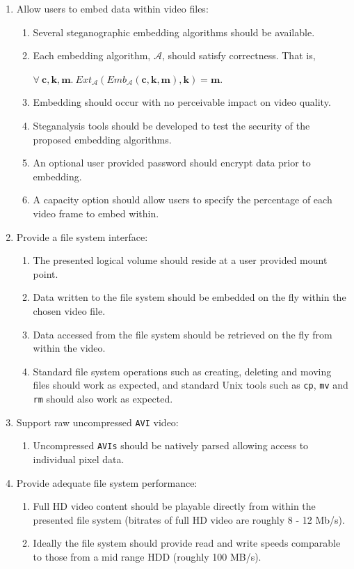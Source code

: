 \documentclass[paper=a4, fontsize=11pt,twoside]{scrartcl}    %
\numberwithin{table}{section}
\numberwithin{figure}{section}
\numberwithin{algorithm}{section}
\begin{document}
\begin{enumerate}
\item Allow users to embed data within video files:
	\begin{enumerate}
		\item Several steganographic embedding algorithms should be available.
		\item Each embedding algorithm, $\mathcal{A}$, should satisfy correctness. That is,
		\begin{center}
			$\forall ~\textbf{c}, \textbf{k}, \textbf{m}. ~Ext_{\mathcal{A}}(Emb_{\mathcal{A}}(\textbf{c}, \textbf{k}, \textbf{m}), \textbf{k}) = \textbf{m}$.
		\end{center}
		\item Embedding should occur with no perceivable impact on video quality.
		\item Steganalysis tools should be developed to test the security of the proposed embedding algorithms.
		\item An optional user provided password should encrypt data prior to embedding.
		\item A capacity option should allow users to specify the percentage of each video frame to embed within.
	\end{enumerate}
\item Provide a file system interface:
	\begin{enumerate}
		\item The presented logical volume should reside at a user provided mount point.		
		\item Data written to the file system should be embedded on the fly within the chosen video file.
		\item Data accessed from the file system should be retrieved on the fly from within the video.
		\item Standard file system operations such as creating, deleting and moving files should work as expected, and standard Unix tools such as \texttt{cp}, \texttt{mv} and \texttt{rm} should also work as expected.
	\end{enumerate}	
\item Support raw uncompressed \texttt{AVI} video:
	\begin{enumerate}
		\item Uncompressed \texttt{AVIs} should be natively parsed allowing access to individual pixel data.
	\end{enumerate}	
\item Provide adequate file system performance:
	\begin{enumerate}
		\item Full HD video content should be playable directly from within the presented file system (bitrates of full HD video are roughly 8 - 12 Mb/s).
		\item Ideally the file system should provide read and write speeds comparable to those from a mid range HDD (roughly 100 MB/s).
	\end{enumerate}		
\end{enumerate}
\end{document}
